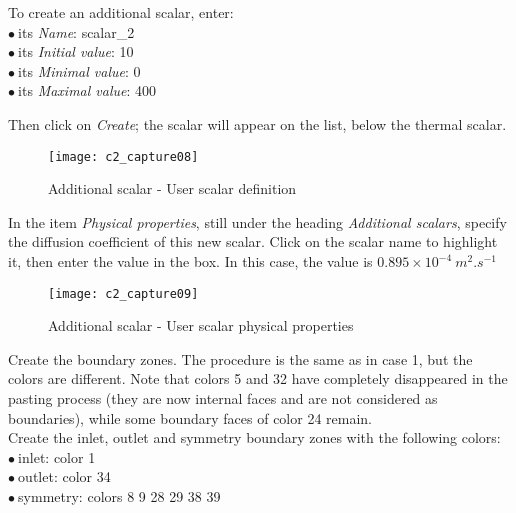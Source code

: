 To create an additional scalar, enter:\\
\hspace*{1cm}$\bullet\ $its {\itshape Name}: scalar\_2\\
\hspace*{1cm}$\bullet\ $its {\itshape Initial value}: 10\\
\hspace*{1cm}$\bullet\ $its {\itshape Minimal value}: 0\\
\hspace*{1cm}$\bullet\ $its {\itshape Maximal value}: 400

Then click on {\itshape Create}; the scalar will appear on the list,
below the thermal scalar.

\begin{figure}[h!]
\begin{center}
\texttt{[image: c2\_capture08]}
\caption{Additional scalar - User scalar definition}
\label{fig8_e2}
\end{center}
\end{figure}


\newpage
In the item {\itshape Physical properties}, still under the heading
{\itshape Additional scalars}, specify the diffusion coefficient of this new
scalar. Click on the scalar name to highlight it, then enter the value in the
box. In this case, the value is
$0.895\times 10^{-4}\ m^{2}.s^{-1}$

\begin{figure}[h!]
\begin{center}
\texttt{[image: c2\_capture09]}
\caption{Additional scalar - User scalar physical properties}
\label{fig9_e2}
\end{center}
\end{figure}


\newpage
Create the boundary zones. The procedure is the same as in case 1, but the
colors are different. Note that colors 5 and 32 have completely disappeared in
the pasting process (they are now internal faces and are not considered as
boundaries), while some boundary faces of color 24 remain.\\
Create the inlet, outlet
and symmetry boundary zones with the following colors:\\
\hspace*{1cm}$\bullet\ $inlet: color 1\\
\hspace*{1cm}$\bullet\ $outlet: color 34\\
\hspace*{1cm}$\bullet\ $symmetry: colors 8 9 28 29 38 39\\

